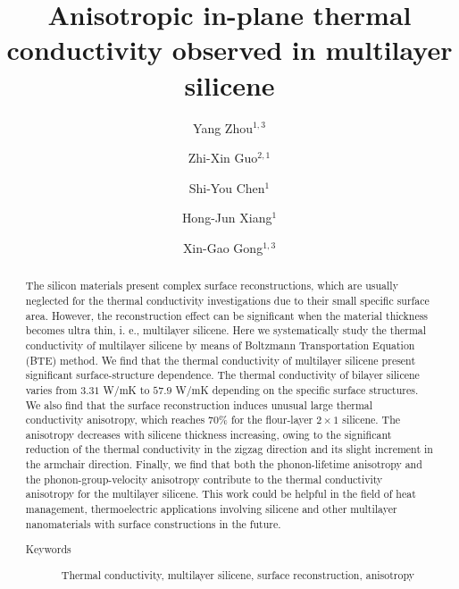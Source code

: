 \documentclass[aps,prb,twocolumn,showpacs,amsmath,amssymb]{revtex4-1}
\begin{document}
\title{Anisotropic in-plane thermal conductivity observed in multilayer silicene}
\author{Yang Zhou${}^{1,3}$}
\author{Zhi-Xin Guo${}^{2,1}$}
\author{Shi-You Chen${}^{1}$}
\author{Hong-Jun Xiang${}^{1}$}
\author{Xin-Gao Gong${}^{1,3}$}
\begin{abstract}
  The silicon materials present complex surface reconstructions, which are usually neglected for the thermal conductivity investigations due to their small specific surface area. However, the reconstruction effect can be significant when the material thickness becomes ultra thin, i. e., multilayer silicene. Here we systematically study the thermal conductivity of multilayer silicene by means of Boltzmann Transportation Equation (BTE) method.  We find that the thermal conductivity of multilayer silicene present significant surface-structure dependence. The thermal conductivity of bilayer silicene varies from $3.31$ W/mK to $57.9$ W/mK depending on the specific surface structures. We also find that the surface reconstruction induces unusual large thermal conductivity anisotropy, which reaches 70\%  for the flour-layer  $2\times1$ silicene.  The anisotropy decreases with silicene thickness increasing, owing to the significant reduction of the thermal conductivity in the zigzag direction and its slight increment  in the armchair direction.
  Finally, we find that both the phonon-lifetime  anisotropy and the phonon-group-velocity  anisotropy contribute to the thermal conductivity anisotropy for the multilayer silicene.
  This work could be helpful in the field of heat management, thermoelectric applications involving silicene and other multilayer nanomaterials  with surface constructions in the future.

  \begin{description}
    \item[Keywords]
          Thermal conductivity, multilayer silicene, surface reconstruction, anisotropy
  \end{description}
\end{abstract}
\end{document}
